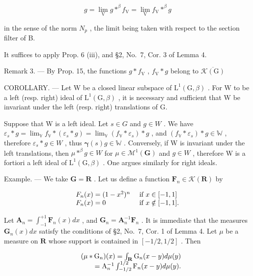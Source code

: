 \[
g = \lim _ {\mathrm{V}} g * ^ {\beta} f _ {\mathrm{V}} = \lim _ {\mathrm{V}} f _ {\mathrm{V}} * ^ {\beta} g
\]

in the sense of the norm \(N_{p}\) , the limit being taken with respect to the section filter of B.

It suffices to apply Prop. 6 (iii), and §2, No.~7, Cor. 3 of Lemma 4.

Remark 3. --- By Prop. 15, the functions \(g * f_{\mathrm{V}}\) , \(f_{\mathrm{V}} * g\) belong to \(\overline{\mathcal{K}(\mathrm{G})}\)

COROLLARY. --- Let W be a closed linear subspace of \(\mathrm{L}^{1}(\mathrm{G},\beta)\) . For W to be a left (resp. right) ideal of \(\mathrm{L}^{1}(\mathrm{G},\beta)\) , it is necessary and sufficient that W be invariant under the left (resp. right) translations of G.

Suppose that W is a left ideal. Let \(s \in G\) and \(g \in W\) . We have \(\varepsilon_{s} * g = \lim_{\mathbb{V}} f_{\mathbb{V}} * (\varepsilon_{s} * g) = \lim_{\mathbb{V}} (f_{\mathbb{V}} * \varepsilon_{s}) * g\) , and \((f_{\mathbb{V}} * \varepsilon_{s}) * g \in \mathbb{W}\) , therefore \(\varepsilon_{s} * g \in W\) , thus \(\boldsymbol{\gamma}(s)g \in \mathbb{W}\) . Conversely, if W is invariant under the left translations, then \(\mu *^{\beta}g \in W\) for \(\mu \in \mathcal{M}^{1}(\mathbf{G})\) and \(g \in W\) , therefore W is a fortiori a left ideal of \(\mathrm{L}^{1}(\mathrm{G}, \beta)\) . One argues similarly for right ideals.

Example. --- We take \(\mathbf{G} = \mathbf{R}\) . Let us define a function \(\mathbf{F}_n \in \mathcal{K}(\mathbf{R})\) by

\[
\begin{array}{l l} F _ {n} (x) = (1 - x ^ {2}) ^ {n} & \text { if } x \in [ - 1, 1 ] \\ F _ {n} (x) = 0 & \text { if } x \notin [ - 1, 1 ]. \end{array}
\]

Let \(\mathbf{A}_n = \int_{-1}^{+1}\mathbf{F}_n(x)dx\) , and \(\mathbf{G}_n = \mathbf{A}_n^{-1}\mathbf{F}_n\) . It is immediate that the measures \(\mathbf{G}_n(x)dx\) satisfy the conditions of §2, No.~7, Cor. 1 of Lemma 4. Let \(\mu\) be a measure on \(\mathbf{R}\) whose support is contained in \([-1/2, 1/2]\) . Then

\[
\begin{array}{r l} & {(\mu * \mathrm{G} _ {n}) (x) = \int_ {\mathbf {R}} \mathrm{G} _ {n} (x - y) d \mu (y)} \\ & {\qquad = \mathrm{A} _ {n} ^ {- 1} \int_ {- 1 / 2} ^ {1 / 2} \mathrm{F} _ {n} (x - y) d \mu (y).} \end{array}
\]


